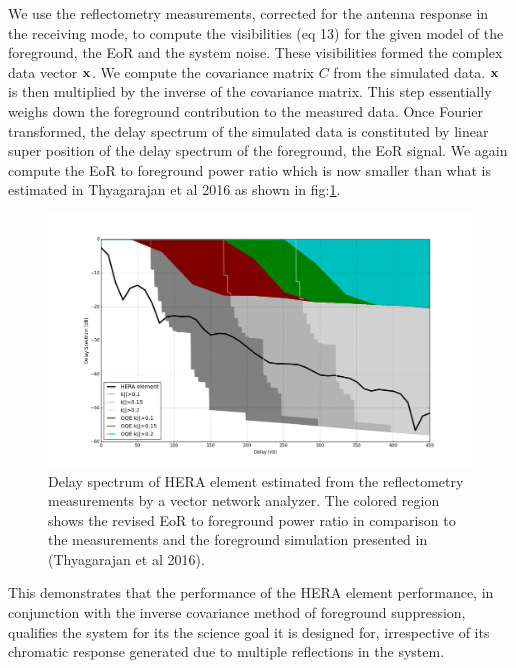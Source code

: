 \documentclass[twocolumn]{emulateapj}
\begin{document}
We use the reflectometry measurements, corrected for the antenna response in the receiving mode, to compute the visibilities (eq 13) for the given model of the foreground, the EoR and the system noise. These visibilities formed the complex data vector $\bold x$. We compute the covariance matrix $C$ from the simulated data. $\bold x$ is then multiplied by the inverse of the covariance matrix. This step essentially weighs down the foreground contribution to the measured data. Once Fourier transformed, the delay spectrum of the simulated data is constituted by linear super position of the delay spectrum of the foreground, the EoR signal.  We again compute the EoR to foreground power ratio which is now smaller than what is estimated in Thyagarajan et al 2016 as shown in fig:\ref{fig:sim_fg_revised}. 
\begin{figure}[ht]
\centering
\includegraphics[width=\linewidth]{GB_reflectometry_part3/plot/HERA_ds_fg_sim_rev.png}
\caption{Delay spectrum of HERA element estimated from the reflectometry measurements by a vector network analyzer. The colored region shows the revised EoR to foreground power ratio in comparison to the measurements and the foreground simulation presented in (Thyagarajan et al 2016).}
\label{fig:sim_fg_revised}
\end{figure}
This demonstrates that the performance of the HERA element performance, in conjunction with the inverse covariance method of foreground suppression, qualifies the system for its the science goal it is designed for, irrespective of its chromatic response generated due to multiple reflections in the system.
\end{document}
